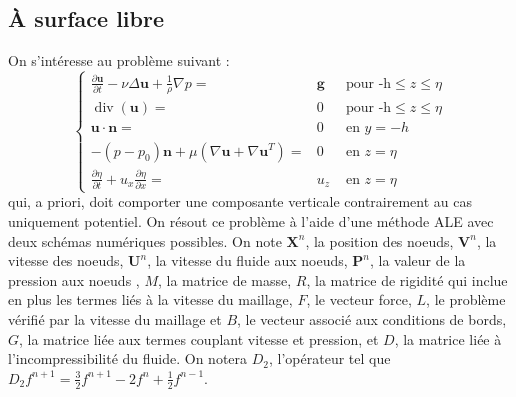 \documentclass{article}
\theoremstyle{plain}
\numberwithin{equation}{section} %
\renewcommand{\div}{\operatorname{div}}
\newcommand{\bu}{{\boldsymbol{u}}}
\begin{document}
\subsection{\`A surface libre}
On s'int\'eresse au probl\`eme suivant :
\[
	\left\{
			\begin{array}{rcl}
   				\frac{\partial \bu}{\partial t} - \nu \Delta\bu+\frac{1}{\rho}\nabla p  =& \mathbf{g}  &\text{ pour -h}\leq z\leq \eta \\
   				\div (\bu) =& 0 &\text{ pour -h}\leq z\leq \eta \\
   				\bu \cdot \mathbf{n} =& 0 &  \text{ en }y=-h \\
   				-(p-p_0)\mathbf{n}+\mu (\nabla \bu + \nabla \bu^T) =& 0 & \text{ en }z=\eta \\
   				\frac{\partial \eta }{ \partial t} + u_x \frac{\partial \eta}{\partial x}  =& u_z & \text{ en }z=\eta
  			\end{array}
	\right.
\]
qui, a priori, doit comporter une composante verticale contrairement au cas uniquement potentiel. On r\'esout ce probl\`eme \`a l'aide d'une m\'ethode ALE avec deux sch\'emas num\'eriques possibles. On note $\mathbf{X}^{n}$, la position des noeuds, $\mathbf{V}^{n}$, la vitesse des noeuds, $\mathbf{U}^{n}$, la vitesse du fluide aux noeuds, $\mathbf{P}^{n}$, la valeur de la pression aux noeuds , $M$, la matrice de masse, $R$, la matrice de rigidit\'e qui inclue en plus les termes li\'es \`a la vitesse du maillage, $F$, le vecteur force, $L$, le probl\`eme v\'erifi\'e par la vitesse du maillage et $B$, le vecteur associé aux conditions de bords, $G$, la matrice li\'ee aux termes couplant vitesse et pression, et $D$, la matrice li\'ee \`a l'incompressibilit\'e du fluide. On notera $D_2$, l'op\'erateur tel que $D_2 f^{n+1}=\frac{3}{2}f^{n+1}-2f^{n}+\frac{1}{2}f^{n-1}$.
\end{document}
